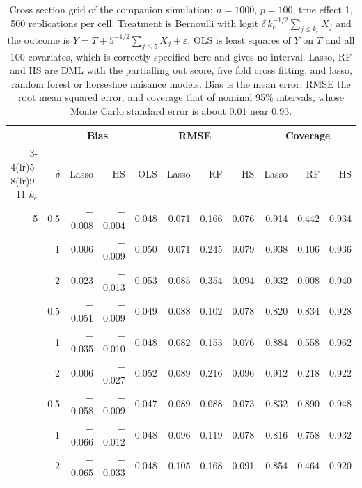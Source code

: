 \begin{table}[ht]
\centering
\caption{Cross section grid of the companion simulation: $n = 1000$, $p = 100$, true effect 1, 500 replications per cell. Treatment is Bernoulli with logit $\delta\,k_e^{-1/2}\sum_{j\le k_e}X_j$ and the outcome is $Y = T + 5^{-1/2}\sum_{j\le 5}X_j + \varepsilon$. OLS is least squares of $Y$ on $T$ and all 100 covariates, which is correctly specified here and gives no interval. Lasso, RF and HS are DML with the partialling out score, five fold cross fitting, and lasso, random forest or horseshoe nuisance models. Bias is the mean error, RMSE the root mean squared error, and coverage that of nominal 95\% intervals, whose Monte Carlo standard error is about 0.01 near 0.93.}
\label{tab:hbdml:cs}
\scriptsize
\setlength{\tabcolsep}{3pt}
\begin{tabular}{rrrrrrrrrrr}
\toprule
 & & \multicolumn{2}{c}{Bias} & \multicolumn{4}{c}{RMSE} & \multicolumn{3}{c}{Coverage} \\
\cmidrule(lr){3-4}\cmidrule(lr){5-8}\cmidrule(lr){9-11}
$k_e$ & $\delta$ & Lasso & HS & OLS & Lasso & RF & HS & Lasso & RF & HS \\
\midrule
5 & 0.5 & $-$0.008 & $-$0.004 & 0.048 & 0.071 & 0.166 & 0.076 & 0.914 & 0.442 & 0.934 \\
 & 1 & 0.006 & $-$0.009 & 0.050 & 0.071 & 0.245 & 0.079 & 0.938 & 0.106 & 0.936 \\
 & 2 & 0.023 & $-$0.013 & 0.053 & 0.085 & 0.354 & 0.094 & 0.932 & 0.008 & 0.940 \\
\addlinespace
25 & 0.5 & $-$0.051 & $-$0.009 & 0.049 & 0.088 & 0.102 & 0.078 & 0.820 & 0.834 & 0.928 \\
 & 1 & $-$0.035 & $-$0.010 & 0.048 & 0.082 & 0.153 & 0.076 & 0.884 & 0.558 & 0.962 \\
 & 2 & 0.006 & $-$0.027 & 0.052 & 0.089 & 0.216 & 0.096 & 0.912 & 0.218 & 0.922 \\
\addlinespace
50 & 0.5 & $-$0.058 & $-$0.009 & 0.047 & 0.089 & 0.088 & 0.073 & 0.832 & 0.890 & 0.948 \\
 & 1 & $-$0.066 & $-$0.012 & 0.048 & 0.096 & 0.119 & 0.078 & 0.816 & 0.758 & 0.932 \\
 & 2 & $-$0.065 & $-$0.033 & 0.048 & 0.105 & 0.168 & 0.091 & 0.854 & 0.464 & 0.920 \\
\bottomrule
\end{tabular}
\end{table}
